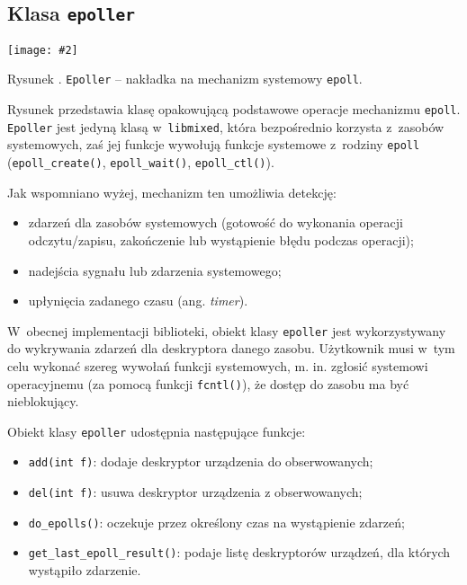 \documentclass[12pt]{mwart}
\newcommand{\code}{\texttt}
\newcommand{\procbr}{()}
\newcommand{\function}[1]{\code{#1\procbr}}
\newcounter{figmain}
\newcommand{\myownfigure}[4]{ \newcounter{#1} \setcounter{#1}{\value{figmain}} \addtocounter{figmain}{1} \begin{center} \label{fig:#1} \centering \texttt{[image: \#2]}\\ \nopagebreak[5] \parbox[t]{11.5cm}{Rysunek \arabic{#1}. #3.} \end{center}}
\begin{document}
\subsection{Klasa \code{epoller}}
\myownfigure{Epoller}{Epoller.png}{\code{Epoller} -- nakładka na mechanizm systemowy \code{epoll}}{.7}
\indent
  Rysunek  przedstawia klasę opakowującą podstawowe operacje mechanizmu \code{epoll}.
  \code{Epoller} jest jedyną klasą w~\code{libmixed}, która bezpośrednio korzysta z~zasobów systemowych, zaś jej funkcje
  wywołują funkcje systemowe z~rodziny \code{epoll} (\function{epoll\_create}, \function{epoll\_wait}, \function{epoll\_ctl}).
\par
\indent
  Jak wspomniano wyżej, mechanizm ten umożliwia detekcję:
  \begin{itemize}
    \item zdarzeń dla zasobów systemowych (gotowość do wykonania operacji odczytu/zapisu, zakończenie lub wystąpienie błędu podczas operacji);
    \item nadejścia sygnału lub zdarzenia systemowego;
    \item upłynięcia zadanego czasu (ang. \emph{timer}).
  \end{itemize}
  W~obecnej implementacji biblioteki, obiekt klasy \code{epoller} jest wykorzystywany do wykrywania zdarzeń dla deskryptora danego zasobu.
  Użytkownik musi w~tym celu wykonać szereg wywołań funkcji systemowych, m. in. zgłosić systemowi operacyjnemu (za pomocą funkcji \function{fcntl}),
  że dostęp do zasobu ma być nieblokujący.
\par
\indent
  Obiekt klasy \code{epoller} udostępnia następujące funkcje:
  \begin{itemize}
    \item \code{add(int f)}: dodaje deskryptor urządzenia do obserwowanych;
    \item \code{del(int f)}: usuwa deskryptor urządzenia z obserwowanych;
    \item \function{do\_epolls}: oczekuje przez określony czas na wystąpienie zdarzeń;
    \item \function{get\_last\_epoll\_result}: podaje listę deskryptorów urządzeń, dla których wystąpiło zdarzenie.
  \end{itemize}
\par
%
\newpage
\end{document}
